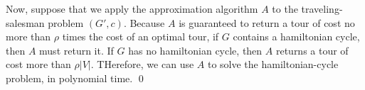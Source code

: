 \begin{description}
  Now, suppose that we apply the approximation algorithm $A$ to the
  traveling-salesman problem $(G',c)$. Because $A$ is guaranteed to return a
  tour of cost no more than $\rho$ times the cost of an optimal tour, if $G$
  contains a hamiltonian cycle, then $A$ must return it. If $G$ has no
  hamiltonian cycle, then $A$ returns a tour of cost more than
  $\rho|V|$. THerefore, we can use $A$ to solve the hamiltonian-cycle problem,
  in polynomial time. \qed
\end{description}
